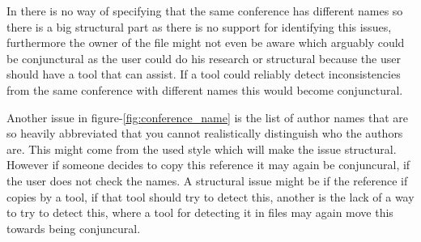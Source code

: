 In {\bibtex} there is no way of specifying that the same conference
has different names so there is a big structural part as there is no
support for identifying this issues, furthermore the owner of the
{\bibtex} file might not even be aware which arguably could be
conjunctural as the user could do his research or structural because
the user should have a tool that can assist.  If a tool could reliably
detect inconsistencies from the same conference with different names
this would become conjunctural.

Another issue in figure-\ref{fig:conference_name} is the list of
author names that are so heavily abbreviated that you cannot
realistically distinguish who the authors are.  This might come from
the used style which will make the issue structural.  However if
someone decides to copy this reference it may again be conjuncural, if
the user does not check the names.  A structural issue might be if the
reference if copies by a tool, if that tool should try to detect this,
another is the lack of a way to try to detect this, where a tool for
detecting it in {\bibtex} files may again move this towards being
conjuncural.
